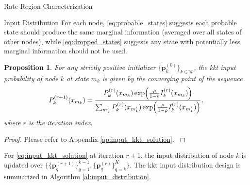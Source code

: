 \documentclass[journal]{IEEEtran}
\newtheorem{proposition}{Proposition}
\begin{document}
\begin{section}{Rate-Region Characterization}
\begin{subsection}{Input Distribution}
		For each node, \eqref{eq:probable_states} suggests each probable state should produce the same marginal information (averaged over all states of other nodes), while \eqref{eq:dropped_states} suggests any state with potentially less marginal information should not be used.
		\begin{proposition}
			For any strictly positive initializer $\{\boldsymbol{p}_k^{(0)}\}_{k \in \mathcal{K}}$, the \gls{kkt} input probability of node $k$ at state $m_k$ is given by the converging point of the sequence
			\begin{equation}
				P_k^{(r+1)}(x_{m_k}) = \frac{P_k^{(r)}(x_{m_k}) \exp \Bigl( \frac{\rho}{1 - \rho} I_k^{(r)}(x_{m_k}) \Bigr)}{\sum_{m_k'} P_k^{(r)}(x_{m_k'}) \exp \Bigl( \frac{\rho}{1 - \rho} I_k^{(r)}(x_{m_k'}) \Bigr)},
				\label{eq:input_kkt_solution}
			\end{equation}
			where $r$ is the iteration index.
			\label{pr:input_kkt_solution}
		\end{proposition}
		\begin{proof}
			Please refer to Appendix \ref{ap:input_kkt_solution}.
			\label{pf:input_kkt_solution}
		\end{proof}

		For \eqref{eq:input_kkt_solution} at iteration $r+1$, the input distribution of node $k$ is updated over $\bigl\{\{\boldsymbol{p}_q^{(r+1)}\}_{q=1}^{k-1},\{\boldsymbol{p}_q^{(r)}\}_{q=k}^{K}\bigr\}$.
		The \gls{kkt} input distribution design is summarized in Algorithm \ref{al:input_distribution}.


\end{subsection}
\end{section}
\end{document}
